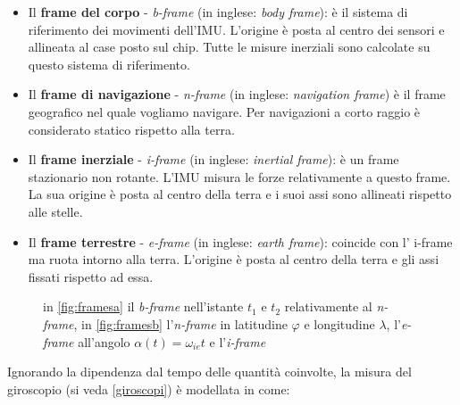 \begin{itemize}
	\item Il \textbf{frame del corpo} - \textit{b-frame} (in inglese: \textit{body frame}): è il sistema							 di riferimento dei movimenti dell'IMU. L'origine è posta al centro dei sensori e allineata al case posto sul chip. Tutte le misure inerziali sono calcolate su questo sistema di riferimento.
	\item Il \textbf{frame di navigazione} - \textit{n-frame} (in inglese: \textit{navigation frame}) è il frame geografico nel quale vogliamo navigare. Per navigazioni a corto raggio è considerato statico rispetto alla terra.
	\item Il \textbf{frame inerziale} - \textit{i-frame} (in inglese: \textit{inertial frame}): è un frame stazionario non rotante. L'IMU misura le forze relativamente a questo frame. La sua origine è posta al centro della terra e i suoi assi sono allineati rispetto alle stelle.
	\item Il \textbf{frame terrestre} - \textit{e-frame} (in inglese: \textit{earth frame}): coincide con l' i-frame ma ruota intorno alla terra. L'origine è posta al centro della terra e gli assi fissati rispetto ad essa.
\end{itemize}



\begin{figure}[H]
	\centering    
	\caption{in \ref{fig:framesa} il \textit{b-frame} nell'istante $t_1$ e $t_2$ relativamente al \textit{n-frame}, in \ref{fig:framesb} l'\textit{n-frame} in latitudine $\varphi$ e longitudine $\lambda$, l'\textit{e-frame} all'angolo $\alpha(t)= \omega_{ie}t$ e l'\textit{i-frame}}
\end{figure}
Ignorando la dipendenza dal tempo delle quantità coinvolte, la misura del giroscopio (si veda \ref{giroscopi}) è modellata in \cite{gyromodel} come:

